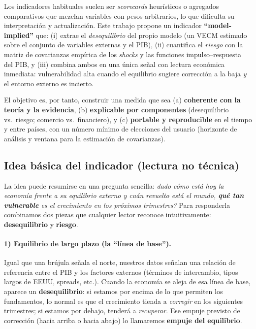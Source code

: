 \documentclass[11pt,a4paper]{article}
\newcommand{\1}{\mathbf{1}}
\begin{document}
Los indicadores habituales suelen ser \emph{scorecards} heurísticos o agregados comparativos que mezclan variables con pesos arbitrarios, lo que dificulta su interpretación y actualización. Este trabajo propone un indicador \textbf{``model-implied''} que:
(i) extrae el \textit{desequilibrio} del propio modelo (un VECM estimado sobre el conjunto de variables externas y el PIB),
(ii) cuantifica el \textit{riesgo} con la matriz de covarianzas empírica de los \emph{shocks} y las funciones impulso--respuesta del PIB,
y (iii) combina ambos en una única señal con lectura económica inmediata: vulnerabilidad alta cuando el equilibrio sugiere corrección a la baja \emph{y} el entorno externo es incierto.

El objetivo es, por tanto, construir una medida que sea (a) \textbf{coherente con la teoría y la evidencia}, (b) \textbf{explicable por componentes} (desequilibrio vs.\ riesgo; comercio vs.\ financiero), y (c) \textbf{portable y reproducible} en el tiempo y entre países, con un número mínimo de elecciones del usuario (horizonte de análisis y ventana para la estimación de covarianzas).


\subsection{Idea básica del indicador (lectura no técnica)}

La idea puede resumirse en una pregunta sencilla: \emph{dado cómo está hoy la economía frente a su equilibrio externo y cuán revuelto está el mundo, \textbf{qué tan vulnerable} es el crecimiento en los próximos trimestres?} 
Para responderla combinamos dos piezas que cualquier lector reconoce intuitivamente: \textbf{desequilibrio} y \textbf{riesgo}.

\paragraph{1) Equilibrio de largo plazo (la ``línea de base'').}
Igual que una brújula señala el norte, nuestros datos señalan una relación de referencia entre el PIB y los factores externos (términos de intercambio, tipos largos de EEUU, spreads, etc.). 
Cuando la economía se aleja de esa línea de base, aparece un \textbf{desequilibrio}: si estamos por encima de lo que permiten los fundamentos, lo normal es que el crecimiento tienda a \emph{corregir} en los siguientes trimestres; si estamos por debajo, tenderá a \emph{recuperar}. 
Ese empuje previsto de corrección (hacia arriba o hacia abajo) lo llamaremos \textbf{empuje del equilibrio}.
\end{document}
